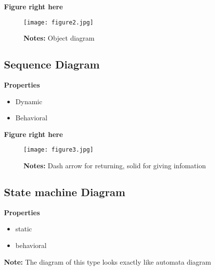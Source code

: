 \documentclass{article}
\begin{document}
\textbf{Figure right here}
\begin{figure}[ht!]
\centering
\texttt{[image: figure2.jpg]}
\caption{\textbf{Notes:} Object diagram}
\label{overflow}
\end{figure}
\pagebreak

\subsection{Sequence Diagram}
\textbf{Properties}
\begin{itemize}
  \item Dynamic
  \item Behavioral
\end{itemize}


\textbf{Figure right here}
\begin{figure}[ht!]
\centering
\texttt{[image: figure3.jpg]}
\caption{\textbf{Notes:} Dash arrow for returning, solid for giving infomation}
\label{overflow}
\end{figure}
\pagebreak


\subsection{State machine Diagram}
\textbf{Properties}
\begin{itemize}
  \item static
  \item behavioral
\end{itemize}
\textbf{Note:} The diagram of this type looks exactly like automata diagram
\end{document}
